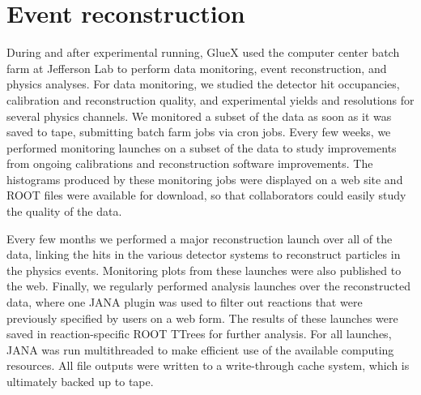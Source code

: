 

\section[Event reconstruction (Alex A.)]{Event reconstruction \label{sec:reconstruction}}


During and after experimental running, GlueX used the computer center batch farm at Jefferson Lab to perform data monitoring, event reconstruction, and physics analyses.  For data monitoring, we studied the detector hit occupancies, calibration and reconstruction quality, and experimental yields and resolutions for several physics channels.  We monitored a subset of the data as soon as it was saved to tape, submitting batch farm jobs via cron jobs.  Every few weeks, we performed monitoring launches on a subset of the data to study improvements from ongoing calibrations and reconstruction software improvements.  The histograms produced by these monitoring jobs were displayed on a web site and ROOT files were available for download, so that collaborators could easily study the quality of the data. 

Every few months we performed a major reconstruction launch over all of the data, linking the hits in the various detector systems to reconstruct particles in the physics events.  Monitoring plots from these launches were also published to the web. Finally, we regularly performed analysis launches over the reconstructed data, where one JANA plugin was used to filter out reactions that were previously specified by users on a web form. The results of these launches were saved in reaction-specific ROOT TTrees for further analysis. For all launches, JANA was run multithreaded to make efficient use of the available computing resources.  %
All file outputs were written to a write-through cache system, which is ultimately backed up to tape.  

